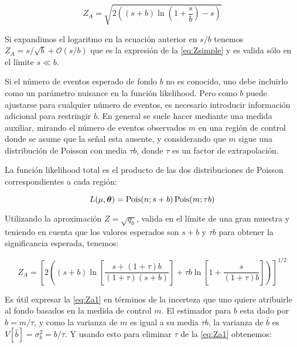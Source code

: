 %

\begin{equation}
  Z_A = \sqrt{2\left( (s+b) \ln \left( 1 + \frac{s}{b}\right) - s \right)}
  \label{eq:Z}
\end{equation}

Si expandimos el logaritmo en la ecuación anterior en $s/b$ tenemos $Z_A =
s/\sqrt{b} + \mathcal{O}(s/b)$ que es la expresión de la {\eq}
\eqref{eq:Zsimple} y es valida sólo en el límite $s \ll b$.

Si el número de eventos esperado de fondo $b$ no es conocido, uno debe incluirlo
como un parámetro nuisance en la función likelihood. Pero como $b$ puede
ajustarse para cualquier número de eventos, es necesario introducir información
adicional para restringir $b$. En general se suele hacer mediante una medida
auxiliar, mirando el número de eventos observados $m$ en una región de control
donde se asume que la señal esta ausente, y considerando que $m$ sigue
una distribución de Poisson con media $\tau b$, donde $\tau$ es un factor de
extrapolación.

La función likelihood total es el producto de las dos distribuciones de Poisson
correspondientes a cada región:

\begin{equation}
  L(\mu, \bm{\theta}) = \operatorname{Pois} (n;s+b) \operatorname{Pois}(m;\tau b)
\end{equation}

Utilizando la aproximación $Z = \sqrt{q_0}$, valida en el límite de una gran
muestra y teniendo en cuenta que los valores esperados son $s+b$ y $\tau b$ para
obtener la significancia esperada, tenemos:

\begin{equation}
  Z_A = \left[ 2 \left( (s+b) \ln \left[ \frac{s+(1+\tau)b}{(1+\tau)(s+b)}
      \right] + \tau b \ln \left[ 1 + \frac{s}{(1+\tau)b} \right] \right)
    \right]^{1/2}
  \label{eq:Za1}
\end{equation}

Es útil expresar la \cref{eq:Za1} en términos de la incerteza que uno
quiere atribuirle al fondo basados en la medida de control $m$. El estimador
para $b$ esta dado por $\hat{b} = m/\tau$, y como la varianza de $m$ es igual a
su media $\tau b$, la varianza de $\hat{b}$ es $V[\hat{b}] = \sigma_b^2 =
b/\tau$. Y usando esto para eliminar $\tau$ de la \cref{eq:Za1}
obtenemos:

